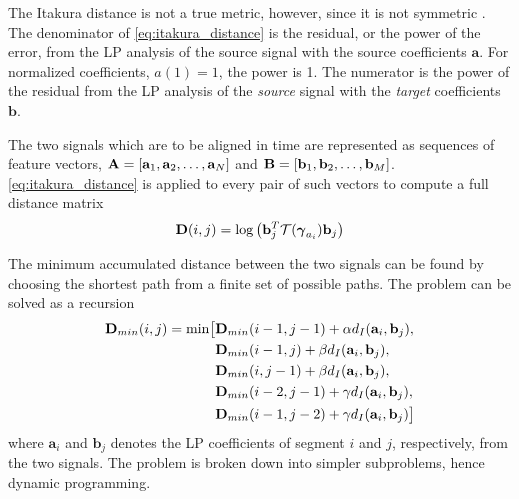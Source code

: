 The Itakura distance is not a true metric, however, since it is not symmetric \cite{kreyszig78}. The denominator of \eqref{eq:itakura_distance} is the residual, or the power of the error, from the LP analysis of the source signal with the source coefficients $\mathbf{a}$. For normalized coefficients, $a(1) = 1$, the power is 1. The numerator is the power of the residual from the LP analysis of the \emph{source} signal with the \emph{target} coefficients $\mathbf{b}$. 

The two signals which are to be aligned in time are represented as sequences of feature vectors, $\mathbf{A}=\left[\mathbf{a}_1,\mathbf{a}_2,\dotsc,\mathbf{a}_N\right]$ and $\mathbf{B}=\left[\mathbf{b}_1,\mathbf{b}_2,\dotsc,\mathbf{b}_M\right]$. \eqref{eq:itakura_distance} is applied to every pair of such vectors to compute a full distance matrix
\begin{equation}
	\mathbf{D}(i,j) = \log\left(\mathbf{b}_j^T \mathcal T(\boldsymbol \gamma_{a_i}) \mathbf{b}_j\right)
\end{equation}

The minimum accumulated distance between the two signals can be found by choosing the shortest path from a finite set of possible paths. The problem can be solved as a recursion \cite{taletek}
\newcommand{\dmin}{\textbf{D}_{min}}
\begin{equation}
	\label{eq:dtw_recursion}
	\begin{split}
		\dmin(i,j) = \min \bigl[& \dmin(i-1,j-1)+\alpha \ita(\mathbf{a}_i,\mathbf{b}_j),\\
		& \dmin(i-1,j)+\beta \ita(\mathbf{a}_i,\mathbf{b}_j),\\
		& \dmin(i,j-1)+\beta \ita(\mathbf{a}_i,\mathbf{b}_j),\\
		& \dmin(i-2,j-1)+\gamma \ita(\mathbf{a}_i,\mathbf{b}_j),\\
		& \dmin(i-1,j-2)+\gamma \ita(\mathbf{a}_i,\mathbf{b}_j)\bigr]		
	\end{split}
\end{equation}
where $\mathbf{a}_i$ and $\mathbf{b}_j$ denotes the LP coefficients of segment $i$ and $j$, respectively, from the two signals. The problem is broken down into simpler subproblems, hence dynamic programming. 

